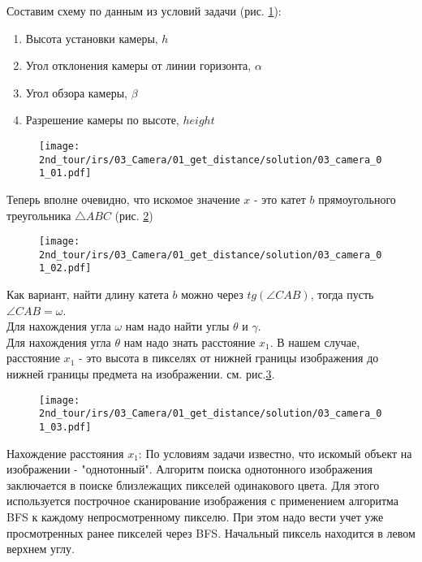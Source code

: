 \solutionSection

Составим схему по данным из условий задачи (рис. \ref{fig:03_camera_01_01}):
\begin{enumerate}
	\item Высота установки камеры, $h$
	\item Угол отклонения камеры от линии горизонта, $\alpha$
	\item Угол обзора камеры, $\beta$
	\item Разрешение камеры по высоте, $height$
\end{enumerate}

\begin{figure}[h!]
	\centering
	\texttt{[image: 2nd\_tour/irs/03\_Camera/01\_get\_distance/solution/03\_camera\_01\_01.pdf]}
	\caption{}
	\label{fig:03_camera_01_01}
\end{figure}

Теперь вполне очевидно, что искомое значение $x$ - это катет $b$ прямоугольного треугольника $\triangle ABC$ (рис. \ref{fig:03_camera_01_02})

\begin{figure}[h!]
	\centering
	\texttt{[image: 2nd\_tour/irs/03\_Camera/01\_get\_distance/solution/03\_camera\_01\_02.pdf]}
	\caption{}
	\label{fig:03_camera_01_02}
\end{figure}

Как вариант, найти длину катета $b$ можно через $tg(\angle CAB)$, тогда пусть $\angle CAB = \omega$.\\
Для нахождения угла $\omega$ нам надо найти углы $\theta$ и $\gamma$. \\
Для нахождения угла $\theta$ нам надо знать расстояние $x_1$. В нашем случае, расстояние $x_1$ - это высота в пикселях от нижней границы изображения до нижней границы предмета на изображении. см. рис.\ref{fig:03_camera_01_03}.

\begin{figure}[h!]
	\centering
	\texttt{[image: 2nd\_tour/irs/03\_Camera/01\_get\_distance/solution/03\_camera\_01\_03.pdf]}
	\caption{}
	\label{fig:03_camera_01_03}
\end{figure}

Нахождение расстояния $x_1$:
По условиям задачи известно, что искомый объект на изображении - "однотонный".
Алгоритм поиска однотонного изображения заключается в поиске близлежащих пикселей одинакового цвета. Для этого используется построчное сканирование изображения с применением алгоритма BFS к каждому непросмотренному пикселю. При этом надо вести учет уже просмотренных ранее пикселей через BFS. Начальный пиксель находится в левом верхнем углу.

